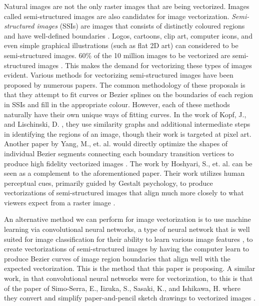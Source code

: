 Natural images are not the only raster images that are being vectorized. Images called semi-structured images are also candidates for image vectorization. \textit{Semi-structured images} (SSIs) are images that consists of distinctly coloured regions and have well-defined boundaries \cite{hoshyari2018perceptiondriven}. Logos, cartoons, clip art, computer icons, and even simple graphical illustrations (such as flat 2D art) can considered to be semi-structured images. 60\% of the 10 million images to be vectorized are semi-structured images \cite{effectiveclipartimagevectorization}. This makes the demand for vectorizing these types of images evident. Various methods for vectorizing semi-structured images have been proposed by numerous papers. The common methodology of these proposals is that they attempt to fit curves or Bezier splines on the boundaries of each region in SSIs and fill in the appropriate colour. However, each of these methods naturally have their own unique ways of fitting curves. In the work of Kopf, J., and Lischinski, D. \cite{depixelizingpixelart}, they use similarity graphs and additional intermediate steps in identifying the regions of an image, though their work is targeted at pixel art. Another paper by Yang, M., et. al. would directly optimize the shapes of individual Bezier segments connecting each boundary transition vertices to produce high fidelity vectorized images \cite{hoshyari2018perceptiondriven}\cite{effectiveclipartimagevectorization}. The work by Hoshyari, S., et. al. can be seen as a complement to the aforementioned paper. Their work utilizes human perceptual cues, primarily guided by Gestalt psychology, to produce vectorizations of semi-structured images that align much more closely to what viewers expect from a raster image \cite{hoshyari2018perceptiondriven}.

An alternative method we can perform for image vectorization is to use machine learning via convolutional neural networks, a type of neural network that is well suited for image classification for their ability to learn various image features \cite{useofcnnimageclassification}, to create vectorizations of semi-structured images by having the computer learn to produce Bezier curves of image region boundaries that align well with the expected vectorization. This is the method that this paper is proposing. A similar work, in that convolutional neural networks were for vectorization, to this is that of the paper of Simo-Serra, E., Iizuka, S., Sasaki, K., and Ishikawa, H. where they convert and simplify paper-and-pencil sketch drawings to vectorized images \cite{simplifyingsketchesviacnn}.

